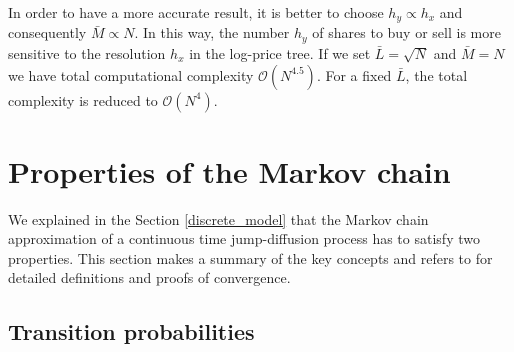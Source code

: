 In order to have a more accurate result, it is better to choose $h_y \propto h_x$ and consequently $\bar M \propto N$. 
In this way, the number $h_y$ of shares to buy or sell is more sensitive to the resolution $h_x$ in the log-price tree.
If we set $\bar L = \sqrt{N}$ and $\bar M = N$ we have total computational complexity $\mathcal{O}(N^{4.5})$. 
For a fixed $\bar L$, the total complexity is reduced to $\mathcal{O}(N^{4})$. 




\section{Properties of the Markov chain} \label{Markov_Chain}
We explained in the Section \ref{discrete_model} that the Markov chain approximation of a continuous time jump-diffusion process
has to satisfy two properties. This section makes a summary of the key concepts 
and refers to \cite{Kushner} for detailed definitions and proofs of convergence. 

\subsection{Transition probabilities}\label{Markov_Chain1}

